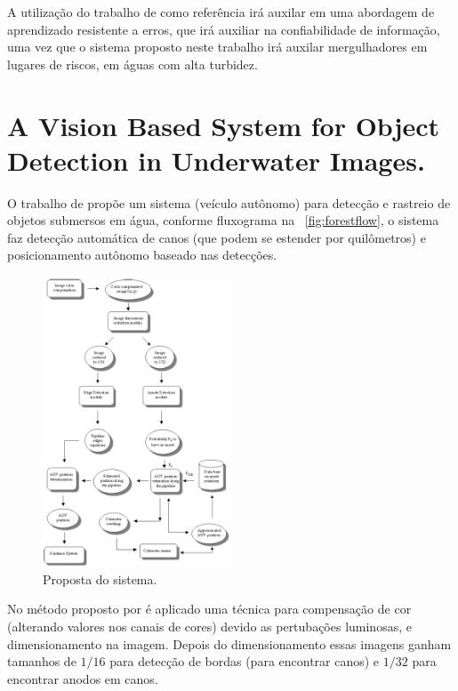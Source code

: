 A utilização do trabalho de  como referência irá auxilar em uma abordagem de aprendizado resistente a erros, que irá auxiliar na confiabilidade de informação, uma vez que o sistema proposto neste trabalho irá auxilar mergulhadores em lugares de riscos, em águas com alta turbidez. 

\section{A Vision Based System for Object Detection in Underwater Images.}

O trabalho de  propõe um sistema (veículo autônomo) para detecção e rastreio de objetos submersos em água, conforme fluxograma na ~\autoref{fig:forestflow}, o sistema faz detecção automática de canos (que podem se estender por quilômetros) e posicionamento autônomo baseado nas detecções.

\begin{figure}[!htbp]
	\caption{\label{fig:forestflow}Proposta do sistema.}
	\begin{center}
	    \includegraphics[width=0.5\textwidth]{resources/flowchartforest}
	\end{center}
\end{figure}

No método proposto por  é aplicado uma técnica para compensação de cor (alterando valores nos canais de cores) devido as pertubações luminosas, e dimensionamento na imagem. Depois do dimensionamento essas imagens ganham tamanhos de $1/16$ para detecção de bordas (para encontrar canos) e $1/32$ para encontrar anodos em canos.

